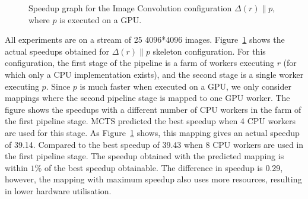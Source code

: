 \documentclass[smallextended]{svjour3}
\begin{document}
\begin{figure}
\begin{center}
\caption{Speedup graph for the Image Convolution configuration
  $\Delta(r) \parallel p$, where $p$ is executed on a GPU.}
\label{ver1}
\end{center}
\end{figure}
All experiments are  on a stream of 25 4096*4096 images.
Figure~\ref{ver1} shows the actual speedups obtained for $ \Delta(r) \parallel p$ skeleton configuration. 
For this configuration, the first stage of the pipeline is a farm of
workers executing $r$ (for which only a CPU implementation exists), and
the second stage is a single
worker executing $p$. Since $p$ is much faster when executed on a GPU,
we only consider mappings where the second pipeline stage is mapped to
one GPU worker. The figure shows the speedups with a different number
of CPU workers in the farm of the first pipeline stage. 
MCTS predicted the best speedup when 4
CPU workers are used for this stage. As Figure~\ref{ver1} shows, 
this mapping gives an actual speedup of 39.14. Compared to the best
speedup of 39.43 when 8 CPU workers are used in the first pipeline
stage. The speedup obtained with the predicted mapping is within $1\%$ of
the best speedup obtainable.
The difference in speedup is 0.29, however, the mapping with maximum speedup
also uses more resources, resulting in lower hardware
utilisation.
\end{document}
